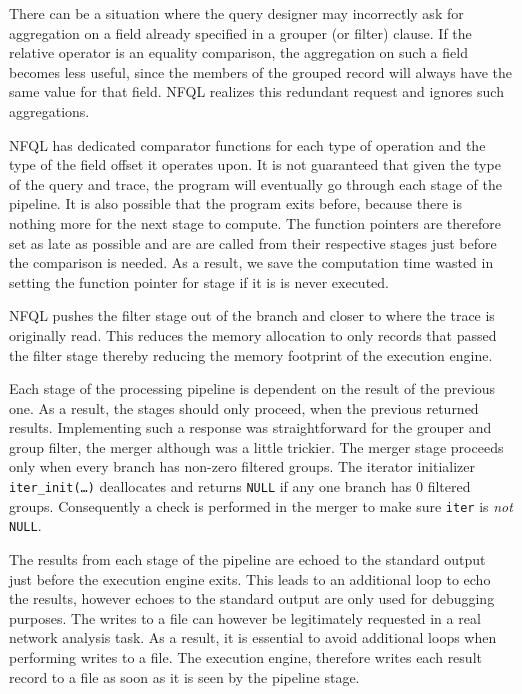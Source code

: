There can be a situation where the query designer may incorrectly ask for
aggregation on a field already specified in a grouper (or filter) clause. If
the relative operator is an equality comparison, the aggregation on such a
field becomes less useful, since the members of the grouped record will always
have the same value for that field. \ac{NFQL} realizes this redundant request
and ignores such aggregations.

\ac{NFQL} has dedicated comparator functions for each type of operation and
the type of the field offset it operates upon. It is not guaranteed that given
the type of the query and trace, the program will eventually go through each
stage of the pipeline. It is also possible that the program exits before,
because there is nothing more for the next stage to compute. The function
pointers are therefore set as late as possible and are are called from their
respective stages just before the comparison is needed.  As a result, we save
the computation time wasted in setting the function pointer for stage if it is
is never executed.

\ac{NFQL} pushes the filter stage out of the branch and closer to where the
trace is originally read. This reduces the memory allocation to only records
that passed the filter stage thereby reducing the memory footprint of the
execution engine.

Each stage of the processing pipeline is dependent on the result of the
previous one. As a result, the stages should only proceed, when the previous
returned results. Implementing such a response was straightforward for the
grouper and group filter, the merger although was a little trickier.  The
merger stage proceeds only when every branch has non-zero filtered groups.
The iterator initializer \texttt{iter\_init(\ldots)} deallocates and returns
\texttt{NULL} if any one branch has $0$ filtered groups.  Consequently a check
is performed in the merger to make sure \texttt{iter} is \emph{not}
\texttt{NULL}.

The results from each stage of the pipeline are echoed to the standard output
just before the execution engine exits. This leads to an additional loop to
echo the results, however echoes to the standard output are only used for
debugging purposes. The writes to a file can however be legitimately requested
in a real network analysis task. As a result, it is essential to avoid
additional loops when performing writes to a file. The execution engine,
therefore writes each result record to a file as soon as it is seen by the
pipeline stage.
